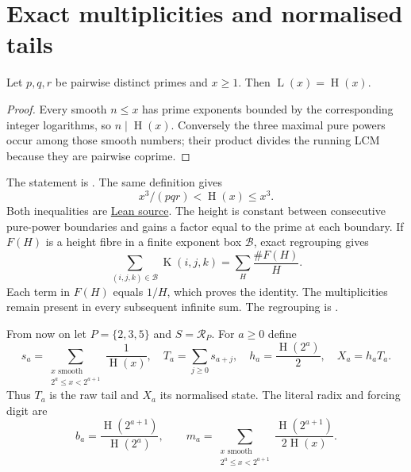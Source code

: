 \documentclass[11pt]{article}
\newcommand{\hgt}{\operatorname{H}}
\newcommand{\Lprefix}{\operatorname{L}}
\newcommand{\Kernel}{\operatorname{K}}
\begin{document}
\section{Exact multiplicities and normalised tails}
\label{sec:lcm}\label{sec:cells}\label{sec:fibre}\label{sec:shell}
\label{sec:actual-orbit}

\begin{proposition}\label{res:lcm}
Let $p,q,r$ be pairwise distinct primes and $x\ge1$.  Then
$\Lprefix(x)=\hgt(x)$.
\end{proposition}
\begin{proof}
Every smooth $n\le x$ has prime exponents bounded by the corresponding
integer logarithms, so $n\mid\hgt(x)$.  Conversely the three maximal pure
powers occur among those smooth numbers; their product divides the running
LCM because they are pairwise coprime.
\end{proof}

\noindent The statement is .
The same definition gives
\begin{equation}\label{res:cube}
 x^3/(pqr)<\hgt(x)\le x^3.
\end{equation}
Both inequalities are \href{https://github.com/wcook04/plectis-erdos/blob/f36a98bf3d3e6f65f1074e3b800e3293d5b8a51a/ErdosProblems/Erdos269/PaperR7BasicAssembly.lean#L112}{Lean source}.
The height is constant between consecutive pure-power boundaries and gains
a factor equal to the prime at each boundary.  If $F(H)$ is a height fibre
in a finite exponent box $\mathcal B$, exact regrouping gives
\begin{equation}\label{res:fibre}
 \sum_{(i,j,k)\in\mathcal B}\Kernel(i,j,k)=\sum_H\frac{\#F(H)}H.
\end{equation}
Each term in $F(H)$ equals $1/H$, which proves the identity.  The
multiplicities remain present in every subsequent infinite sum.
The regrouping is .

From now on let $P=\{2,3,5\}$ and $S=\mathcal R_P$.  For $a\ge0$ define
\[
 s_a=\sum_{\substack{x\text{ smooth}\\2^a\le x<2^{a+1}}}\frac1{\hgt(x)},
 \quad T_a=\sum_{j\ge0}s_{a+j},\quad
 h_a=\frac{\hgt(2^a)}2,\quad X_a=h_aT_a.
\]
Thus $T_a$ is the raw tail and $X_a$ its normalised state.
The literal radix and forcing digit are
\begin{equation}\label{eq:actual-digit}
 b_a=\frac{\hgt(2^{a+1})}{\hgt(2^a)},\qquad
 m_a=\sum_{\substack{x\text{ smooth}\\2^a\le x<2^{a+1}}}
       \frac{\hgt(2^{a+1})}{2\hgt(x)}.
\end{equation}
\end{document}
